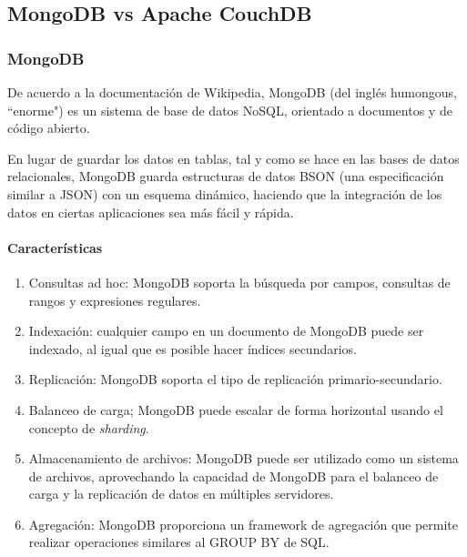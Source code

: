 \subsection{MongoDB vs Apache CouchDB}
\subsubsection*{MongoDB}
De acuerdo a la documentación de Wikipedia\cite{noauthor_mongodb_nodate}, MongoDB (del inglés humongous, ``enorme") es un sistema de base de datos NoSQL, orientado a documentos y de código abierto.


En lugar de guardar los datos en tablas, tal y como se hace en las bases de datos relacionales, MongoDB guarda estructuras de datos BSON (una especificación similar a JSON) con un esquema dinámico, haciendo que la integración de los datos en ciertas aplicaciones sea más fácil y rápida.

\paragraph*{Características}
\begin{enumerate}
    \item Consultas ad hoc: MongoDB soporta la búsqueda por campos, consultas de rangos y expresiones regulares.
    \item Indexación: cualquier campo en un documento de MongoDB puede ser indexado, al igual que es posible hacer índices secundarios. 
    \item Replicación: MongoDB soporta el tipo de replicación primario-secundario. 
    \item Balanceo de carga; MongoDB puede escalar de forma horizontal usando el concepto de \textit{sharding}.
    \item Almacenamiento de archivos: MongoDB puede ser utilizado como un sistema de archivos, aprovechando la capacidad de MongoDB para el balanceo de carga y la replicación de datos en múltiples servidores. 
    \item Agregación: MongoDB proporciona un framework de agregación que permite realizar operaciones similares al GROUP BY de SQL.
\end{enumerate}
